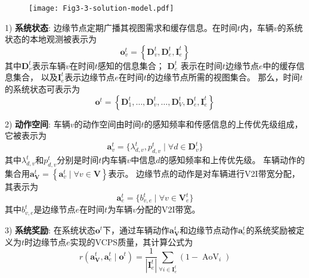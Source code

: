 \begin{figure}[h]
\centering
  \texttt{[image: Fig3-3-solution-model.pdf]}
  \label{fig 3-3}
\end{figure}

1) \textbf{系统状态}: 边缘节点定期广播其视图需求和缓存信息。在时间$t$内，车辆$v$的系统状态的本地观测被表示为 
	\begin{equation}
		\boldsymbol{o}_{v}^{t}=\left\{\mathbf{D}_{v}^{t}, \mathbf{D}_{e}^{t}, \mathbf{I}_e^t\right\}
	\end{equation} 
	\noindent 其中$\mathbf{D}_{v}^{t}$表示车辆$v$在时间$t$感知的信息集合；
	$\mathbf{D}_{e}^{t}$ 表示在时间$t$边缘节点$e$中的缓存信息集合，
	以及$\mathbf{I}_e^t$表示边缘节点$e$在时间$t$的边缘节点所需的视图集合。
	那么，时间$t$的系统状态可表示为
	\begin{equation}
		\boldsymbol{o}^{t}=\left\{\mathbf{D}_{1}^{t}, \ldots, \mathbf{D}_{v}^{t}, \ldots, \mathbf{D}_{V}^{t}, \mathbf{D}_{e}^{t}, \mathbf{I}_{e}^{t}\right\}
	\end{equation}

2) \textbf{动作空间}: 车辆$v$的动作空间由时间$t$的感知频率和传感信息的上传优先级组成，它被表示为 
	\begin{equation}
		\boldsymbol{a}_{v}^{t}=\{ \lambda_{d, v}^{t}, p_{d, v}^{t} \mid \forall d \in \mathbf{D}_{v}^t\}
	\end{equation}
	\noindent 其中$\lambda_{d, v}^{t}$和$p_{d, v}^{t}$分别是时间$t$内车辆$v$中信息$d$的感知频率和上传优先级。
	车辆动作的集合用$\boldsymbol{a}_{\mathbf{V}}^{t} = \left\{\boldsymbol{a}_{v}^{t}\mid \forall v \in \mathbf{V}\right\}$表示。
	边缘节点的动作是对车辆进行V2I带宽分配，其表示为 
	\begin{equation}
		\boldsymbol{a}_{e}^{t}=\{b_{v, e}^{t} \mid \forall v \in \mathbf{V}_{e}^{t}\}
	\end{equation}
	其中$b_{v, e}^t$是边缘节点$e$在时间$t$为车辆$v$分配的V2I带宽。
	
3) \textbf{系统奖励}: 在系统状态$\boldsymbol{o}^{t}$下，通过车辆动作$\boldsymbol{a}_{\mathbf{V}}^{t}$和边缘节点动作$\boldsymbol{a}_{e}^{t}$的系统奖励被定义为$t$时边缘节点$e$实现的VCPS质量，其计算公式为
	\begin{equation}
		r\left(\boldsymbol{a}_{\mathbf{V}}^{t},\boldsymbol{a}_{e}^{t} \mid \boldsymbol{o}^{t}\right)=\frac{1}{\left|\mathbf{I}_e^t\right|} \sum_{\forall i \in \mathbf{I}_e^t}\left(1 -\operatorname{AoV}_{i} \right)
	\end{equation}
	
